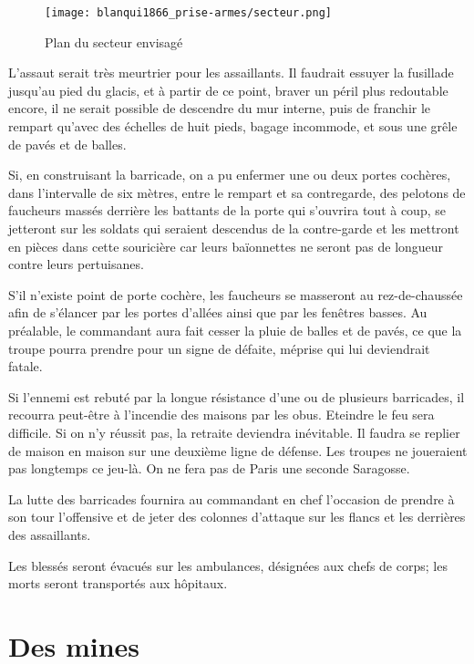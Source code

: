 \documentclass[french,twoside]{book} %
\begin{document}
\begin{figure}[h]
  \centering
  \texttt{[image: blanqui1866\_prise-armes/secteur.png]}
\caption{Plan du secteur envisagé}
\end{figure}

\noindent L'assaut serait très meurtrier pour les assaillants. Il faudrait essuyer la fusillade jusqu’au pied du glacis, et à partir de ce point, braver un péril plus redoutable encore, il ne serait possible de descendre du mur interne, puis de franchir le rempart qu’avec des échelles de huit pieds, bagage incommode, et sous une grêle de pavés et de balles.\par
Si, en construisant la barricade, on a pu enfermer une ou deux portes cochères, dans l’intervalle de six mètres, entre le rempart et sa contregarde, des pelotons de faucheurs massés derrière les battants de la porte qui s’ouvrira tout à coup, se jetteront sur les soldats qui seraient descendus de la contre-garde et les mettront en pièces dans cette souricière car leurs baïonnettes ne seront pas de longueur contre leurs pertuisanes.\par
S'il n’existe point de porte cochère, les faucheurs se masseront au rez-de-chaussée afin de s’élancer par les portes d’allées ainsi que par les fenêtres basses. Au préalable, le commandant aura fait cesser la pluie de balles et de pavés, ce que la troupe pourra prendre pour un signe de défaite, méprise qui lui deviendrait fatale.\par
Si l’ennemi est rebuté par la longue résistance d’une ou de plusieurs barricades, il recourra peut-être à l’incendie des maisons par les obus. Eteindre le feu sera difficile. Si on n’y réussit pas, la retraite deviendra inévitable. Il faudra se replier de maison en maison sur une deuxième ligne de défense. Les troupes ne joueraient pas longtemps ce jeu-là. On ne fera pas de Paris une seconde Saragosse.\par
La lutte des barricades fournira au commandant en chef l’occasion de prendre à son tour l’offensive et de jeter des colonnes d’attaque sur les flancs et les derrières des assaillants.\par
Les blessés seront évacués sur les ambulances, désignées aux chefs de corps; les morts seront transportés aux hôpitaux.
\section[{Des mines}]{Des mines}\renewcommand{\leftmark}{Des mines}
\end{document}
